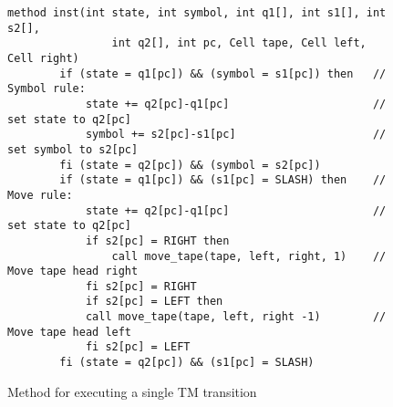 \begin{figure}[ht]
    \centering
    \begin{lstlisting}[style = basic, language = roopl]
    method inst(int state, int symbol, int q1[], int s1[], int s2[], 
                int q2[], int pc, Cell tape, Cell left, Cell right)
        if (state = q1[pc]) && (symbol = s1[pc]) then   // Symbol rule:
            state += q2[pc]-q1[pc]                      // set state to q2[pc]
            symbol += s2[pc]-s1[pc]                     // set symbol to s2[pc]
        fi (state = q2[pc]) && (symbol = s2[pc])
        if (state = q1[pc]) && (s1[pc] = SLASH) then    // Move rule:
            state += q2[pc]-q1[pc]                      // set state to q2[pc]
            if s2[pc] = RIGHT then
                call move_tape(tape, left, right, 1)    // Move tape head right
            fi s2[pc] = RIGHT
            if s2[pc] = LEFT then
            call move_tape(tape, left, right -1)        // Move tape head left
            fi s2[pc] = LEFT
        fi (state = q2[pc]) && (s1[pc] = SLASH)
    \end{lstlisting}
    \caption{Method for executing a single TM transition}
    \label{fig:rtm-instruction-method}
\end{figure}

